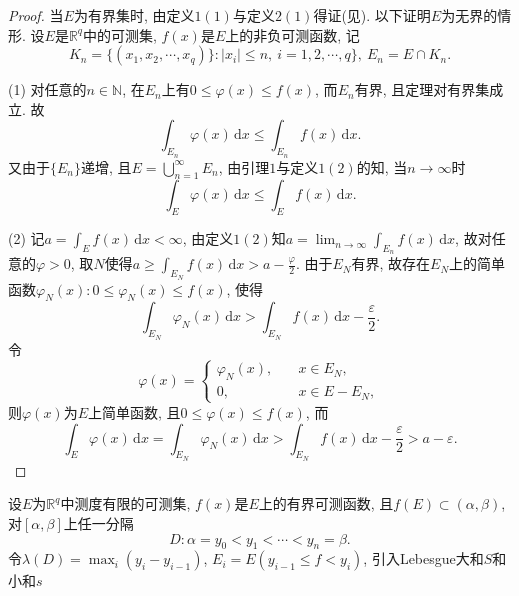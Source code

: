 \documentclass[12pt, a4paper, oneside]{ctexart}
\numberwithin{equation}{section}  %
\let\leq=\leqslant %
\let\geq=\geqslant %
\def\R{\mathbb{R}}          %
\def\N{\mathbb{N}}
\def\d{\mathrm{d}}          %
\begin{document}
\begin{proof}
    当$E$为有界集时, 由定义$1(1)$与定义$2(1)$得证(见\cite{sbhs}). 以下证明$E$为无界的情形. 设$E$是$\R^q$中的可测集, $f(x)$是$E$上的非负可测函数, 记
    \begin{equation*}
        K_n=\{(x_1,x_2,\cdots, x_q)\}:|x_i|\leq n,\ i=1,2,\cdots, q\},\ E_n=E\cap K_n.
    \end{equation*}

    (1) 对任意的$n\in\N$, 在$E_n$上有$0\leq \varphi(x)\leq f(x)$, 而$E_n$有界, 且定理对有界集成立. 故
    \begin{equation*}
        \int_{E_n}\varphi(x)\,\d x\leq \int_{E_n}f(x)\,\d x.
    \end{equation*}
    又由于$\{E_n\}$递增, 且$E=\bigcup_{n=1}^\infty E_n$, 由引理$1$与定义$1(2)$的知, 当$n\to\infty$时
    \begin{equation*}
        \int_E\varphi(x)\,\d x\leq \int_{E}f(x)\,\d x.
    \end{equation*}

    (2) 记$a=\int_Ef(x)\,\d x < \infty$, 由定义$1(2)$知$a=\lim_{n\to\infty}\int_{E_n}f(x)\,\d x$, 故对任意的$\varphi > 0$, 取$N$使得$a\geq \int_{E_N}f(x)\,\d x>a-\frac{\varphi}{2}$. 由于$E_N$有界, 故存在$E_N$上的简单函数$\varphi_N(x):0\leq \varphi_N(x)\leq f(x)$, 使得\begin{equation*}
        \int_{E_N}\varphi_N(x)\,\d x > \int_{E_N}f(x)\,\d x-\frac{\varepsilon}{2}.
    \end{equation*}
    令
    \begin{equation*}
        \varphi(x) = \begin{cases}
            \varphi_N(x), &\quad x\in E_N,\\
            0,&\quad x\in E-E_N,
        \end{cases}
    \end{equation*}
    则$\varphi(x)$为$E$上简单函数, 且$0\leq \varphi(x)\leq f(x)$, 而
    \begin{equation*}
        \int_{E}\varphi(x)\,\d x=\int_{E_N}\varphi_N(x)\,\d x > \int_{E_N}f(x)\,\d x-\frac{\varepsilon}{2}>a-\varepsilon.
    \end{equation*}
\end{proof}
设$E$为$\R^q$中测度有限的可测集, $f(x)$是$E$上的有界可测函数, 且$f(E)\subset (\alpha, \beta)$, 对$[\alpha, \beta]$上任一分隔
\begin{equation*}
    D:\alpha = y_0 < y_1<\cdots < y_n=\beta.
\end{equation*}
令$\lambda(D) = \max_i(y_i-y_{i-1})$, $E_i = E(y_{i-1}\leq f < y_i)$, 引入Lebesgue大和$S$和小和$s$
\end{document}
